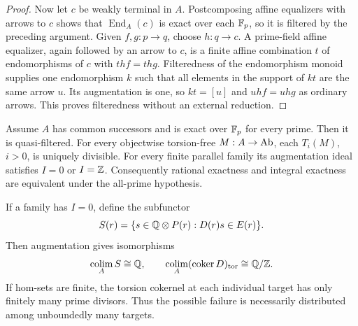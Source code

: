 \begin{proof}
Now let $c$ be weakly terminal in $A$. Postcomposing affine equalizers
with arrows to $c$ shows that $\operatorname{End}_A(c)$ is exact over
each $\mathbb F_p$, so it is filtered by the preceding argument. Given
$f,g:p\to q$, choose $h:q\to c$. A prime-field affine equalizer,
again followed by an arrow to $c$, is a finite affine combination
$t$ of endomorphisms of $c$ with $thf=thg$. Filteredness of the
endomorphism monoid supplies one endomorphism $k$ such that all
elements in the support of $kt$ are the same arrow $u$.
Its augmentation is one, so $kt=[u]$ and $uhf=uhg$ as ordinary
arrows. This proves filteredness without an external reduction.
\end{proof}

\begin{proposition}\label{C:rational-gate}
Assume $A$ has common successors and is exact over $\mathbb F_p$ for every prime. Then it is quasi-filtered. For every objectwise torsion-free $M:A\to\mathrm{Ab}$, each $T_i(M)$, $i>0$, is uniquely divisible. For every finite parallel family its augmentation ideal satisfies $I=0$ or $I=\mathbb Z$. Consequently rational exactness and integral exactness are equivalent under the all-prime hypothesis.

If a family has $I=0$, define the subfunctor
\[
 S(r)=\{s\in\mathbb Q\otimes P(r):D(r)s\in E(r)\}.
\]
Then augmentation gives isomorphisms
\[
 \operatorname*{colim}_A S\cong\mathbb Q,\qquad
 \operatorname*{colim}_A (\operatorname{coker} D)_{\mathrm{tor}}\cong\mathbb Q/\mathbb Z.
\]
If hom-sets are finite, the torsion cokernel at each individual target has only finitely many prime divisors. Thus the possible failure is necessarily distributed among unboundedly many targets.
\end{proposition}
